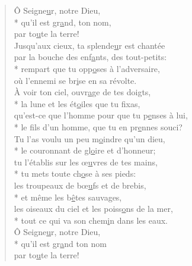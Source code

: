
\begin{verse}
Ô Seigne\underline{u}r, notre Dieu, \\*
qu’il est gr\underline{a}nd, ton nom, \\
par to\underline{u}te la terre! \\

Jusqu’aux cieux, ta splende\underline{u}r est chantée \\
par la bouche des enf\underline{a}nts, des tout-petits: \\*
rempart que tu opp\underline{o}ses à l’adversaire, \\
où l’ennemi se br\underline{i}se en sa révolte. \\

À voir ton ciel, ouvr\underline{a}ge de tes doigts, \\*
la lune et les ét\underline{o}iles que tu fixas, \\
qu’est-ce que l’homme pour que tu p\underline{e}nses à lui, \\*
le fils d’un homme, que tu en pr\underline{e}nnes souci? \\

Tu l’as voulu un peu m\underline{o}indre qu’un dieu, \\*
le couronnant de gl\underline{o}ire et d’honneur; \\
tu l’établis sur les œ\underline{u}vres de tes mains, \\*
tu mets toute ch\underline{o}se à ses pieds: \\

les troupeaux de bœ\underline{u}fs et de brebis, \\*
et même les b\underline{ê}tes sauvages, \\
les oiseaux du ciel et les poiss\underline{o}ns de la mer, \\*
tout ce qui va son chem\underline{i}n dans les eaux. \\

Ô Seigne\underline{u}r, notre Dieu, \\*
qu’il est gr\underline{a}nd ton nom \\
par to\underline{u}te la terre! \\
\end{verse}

